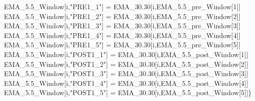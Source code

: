 \documentclass[12pt,twoside]{reedthesis}
\newenvironment{Shaded}{\begin{snugshade}}{\end{snugshade}}
\newcommand{\DecValTok}[1]{\textcolor[rgb]{0.00,0.00,0.81}{#1}}
\newcommand{\FloatTok}[1]{\textcolor[rgb]{0.00,0.00,0.81}{#1}}
\newcommand{\NormalTok}[1]{#1}
\newcommand{\StringTok}[1]{\textcolor[rgb]{0.31,0.60,0.02}{#1}}
\begin{document}
\begin{Shaded}
\begin{Highlighting}[]
\NormalTok{  EMA_}\FloatTok{5.5}\NormalTok{_Window[i,}\StringTok{"PRE1_1"}\NormalTok{] =}\StringTok{ }\NormalTok{EMA_}\FloatTok{30.30}\NormalTok{[i,EMA_}\FloatTok{5.5}\NormalTok{_pre_Window[}\DecValTok{1}\NormalTok{]]}
\NormalTok{  EMA_}\FloatTok{5.5}\NormalTok{_Window[i,}\StringTok{"PRE1_2"}\NormalTok{] =}\StringTok{ }\NormalTok{EMA_}\FloatTok{30.30}\NormalTok{[i,EMA_}\FloatTok{5.5}\NormalTok{_pre_Window[}\DecValTok{2}\NormalTok{]]}
\NormalTok{  EMA_}\FloatTok{5.5}\NormalTok{_Window[i,}\StringTok{"PRE1_3"}\NormalTok{] =}\StringTok{ }\NormalTok{EMA_}\FloatTok{30.30}\NormalTok{[i,EMA_}\FloatTok{5.5}\NormalTok{_pre_Window[}\DecValTok{3}\NormalTok{]]}
\NormalTok{  EMA_}\FloatTok{5.5}\NormalTok{_Window[i,}\StringTok{"PRE1_4"}\NormalTok{] =}\StringTok{ }\NormalTok{EMA_}\FloatTok{30.30}\NormalTok{[i,EMA_}\FloatTok{5.5}\NormalTok{_pre_Window[}\DecValTok{4}\NormalTok{]]}
\NormalTok{  EMA_}\FloatTok{5.5}\NormalTok{_Window[i,}\StringTok{"PRE1_5"}\NormalTok{] =}\StringTok{ }\NormalTok{EMA_}\FloatTok{30.30}\NormalTok{[i,EMA_}\FloatTok{5.5}\NormalTok{_pre_Window[}\DecValTok{5}\NormalTok{]]}
\NormalTok{  EMA_}\FloatTok{5.5}\NormalTok{_Window[i,}\StringTok{"POST1_1"}\NormalTok{] =}\StringTok{ }\NormalTok{EMA_}\FloatTok{30.30}\NormalTok{[i,EMA_}\FloatTok{5.5}\NormalTok{_post_Window[}\DecValTok{1}\NormalTok{]]}
\NormalTok{  EMA_}\FloatTok{5.5}\NormalTok{_Window[i,}\StringTok{"POST1_2"}\NormalTok{] =}\StringTok{ }\NormalTok{EMA_}\FloatTok{30.30}\NormalTok{[i,EMA_}\FloatTok{5.5}\NormalTok{_post_Window[}\DecValTok{2}\NormalTok{]]}
\NormalTok{  EMA_}\FloatTok{5.5}\NormalTok{_Window[i,}\StringTok{"POST1_3"}\NormalTok{] =}\StringTok{ }\NormalTok{EMA_}\FloatTok{30.30}\NormalTok{[i,EMA_}\FloatTok{5.5}\NormalTok{_post_Window[}\DecValTok{3}\NormalTok{]]}
\NormalTok{  EMA_}\FloatTok{5.5}\NormalTok{_Window[i,}\StringTok{"POST1_4"}\NormalTok{] =}\StringTok{ }\NormalTok{EMA_}\FloatTok{30.30}\NormalTok{[i,EMA_}\FloatTok{5.5}\NormalTok{_post_Window[}\DecValTok{4}\NormalTok{]]}
\NormalTok{  EMA_}\FloatTok{5.5}\NormalTok{_Window[i,}\StringTok{"POST1_5"}\NormalTok{] =}\StringTok{ }\NormalTok{EMA_}\FloatTok{30.30}\NormalTok{[i,EMA_}\FloatTok{5.5}\NormalTok{_post_Window[}\DecValTok{5}\NormalTok{]]\}}


\end{Highlighting}
\end{Shaded}
\end{document}
